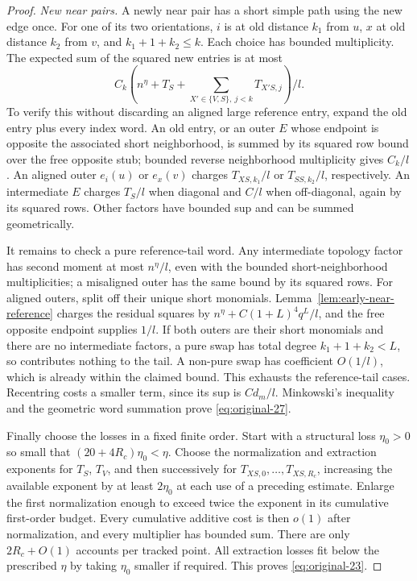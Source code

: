 \begin{proof}
\par\smallskip\noindent\textit{New near pairs.}\quad
A newly near pair has a short simple path using the new edge once.
For one of its two orientations, \(i\) is at old distance
\(k_1\) from \(u\), \(x\) at old distance \(k_2\) from \(v\),
and \(k_1+1+k_2\le k\). Each choice has bounded multiplicity.
The expected sum of the squared new entries is at most
\begin{equation}
 C_k\left(n^\eta+T_S+
       \sum_{X'\in\{V,S\},\ j<k}T_{X'S,j}\right)/l.
\label{eq:original-27}
\end{equation}
To verify this without discarding an aligned large reference entry,
expand the old entry plus every index word. An old entry, or an
outer \(E\) whose endpoint is opposite the associated short
neighborhood, is summed by its squared row bound over the free
opposite stub; bounded reverse neighborhood multiplicity gives
\(C_k/l\). An aligned outer \(e_i(u)\) or \(e_x(v)\) charges
\(T_{XS,k_1}/l\) or \(T_{SS,k_2}/l\), respectively. An
intermediate \(E\) charges \(T_S/l\) when diagonal and \(C/l\)
when off-diagonal, again by its squared rows. Other factors have
bounded sup and can be summed geometrically.

It remains to check a pure reference-tail word. Any intermediate
topology factor has second moment at most \(n^\eta/l\), even
with the bounded short-neighborhood multiplicities; a misaligned
outer has the same bound by its squared rows. For aligned outers,
split off their unique short monomials. Lemma~\ref{lem:early-near-reference}
charges the residual squares by
\(n^\eta+C(1+L)^4q^L/l\), and the free opposite endpoint supplies
\(1/l\). If both outers are their short monomials and there are
no intermediate factors, a pure swap has total degree
\(k_1+1+k_2<L\), so contributes nothing to the tail. A non-pure
swap has coefficient \(O(1/l)\), which is already within the
claimed bound. This exhausts the reference-tail cases. Recentring
costs a smaller term, since its sup is \(Cd_m/l\).
Minkowski's inequality and the geometric word summation prove
\eqref{eq:original-27}.

Finally choose the losses in a fixed finite order. Start with a
structural loss \(\eta_0>0\) so small that
\((20+4R_c)\eta_0<\eta\). Choose the normalization and extraction
exponents for \(T_S\), \(T_V\), and then successively for
\(T_{XS,0},\ldots,T_{XS,R_c}\), increasing the available exponent
by at least \(2\eta_0\) at each use of a preceding estimate.
Enlarge the first normalization enough to exceed twice the exponent
in its cumulative first-order budget. Every cumulative additive
cost is then \(o(1)\) after normalization, and every multiplier
has bounded sum. There are only \(2R_c+O(1)\) accounts per tracked
point. All extraction losses fit below the prescribed \(\eta\)
by taking \(\eta_0\) smaller if required. This proves
\eqref{eq:original-23}.
\end{proof}

